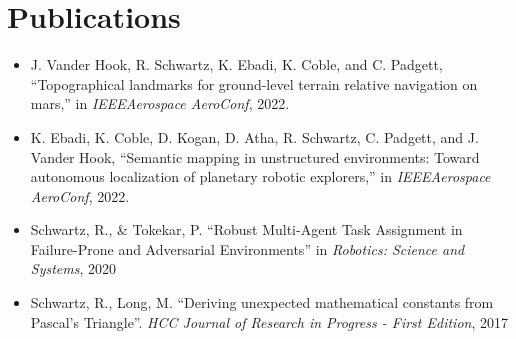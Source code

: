 \documentclass[letterpaper,11pt]{article}
\makeatletter
\newcommand{\resumeItem}[1]{
  \item\small{
    {#1 \vspace{-2pt}}
  }
}
\newcommand{\resumeProjectHeading}[2]{
    \item
    \begin{tabular*}{0.97\textwidth}{l@{\extracolsep{\fill}}r}
      \small#1 & #2 \\
    \end{tabular*}\vspace{-7pt}
}
\newcommand{\resumeSubHeadingListStart}{\begin{itemize}[leftmargin=0.15in, label={}]}
\newcommand{\resumeSubHeadingListEnd}{\end{itemize}}
\newcommand{\resumeItemListStart}{\begin{itemize}}
\newcommand{\resumeItemListEnd}{\end{itemize}\vspace{-5pt}}
\makeatother
\begin{document}


\section{Publications}
\small{
    \begin{itemize}
        \item J. Vander Hook, R. Schwartz, K. Ebadi, K. Coble, and C. Padgett, ``Topographical landmarks for ground-level terrain relative navigation on mars,'' in \textit{IEEEAerospace AeroConf}, 2022.

        \item K. Ebadi, K. Coble, D. Kogan, D. Atha, R. Schwartz, C. Padgett, and J. Vander Hook, ``Semantic  mapping in unstructured environments:  Toward autonomous localization of planetary robotic explorers,'' in \textit{IEEEAerospace AeroConf}, 2022.

        \item Schwartz, R., \& Tokekar, P. ``Robust Multi-Agent Task Assignment in Failure-Prone and Adversarial Environments'' in \textit{Robotics: Science and Systems}, 2020

        \item Schwartz, R., Long, M. ``Deriving unexpected mathematical constants from Pascal's Triangle''. \textit{HCC Journal of Research in Progress - First Edition}, 2017
    \end{itemize}
    
}
\end{document}
